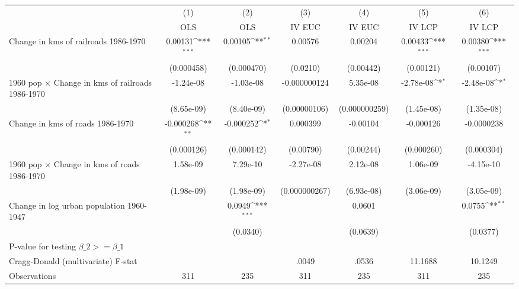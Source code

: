 {
\def\sym#1{\ifmmode^{#1}\else\(^{#1}\)\fi}
\begin{tabular}{l*{6}{c}}
\hline\hline
                &\multicolumn{1}{c}{(1)}&\multicolumn{1}{c}{(2)}&\multicolumn{1}{c}{(3)}&\multicolumn{1}{c}{(4)}&\multicolumn{1}{c}{(5)}&\multicolumn{1}{c}{(6)}\\
                &\multicolumn{1}{c}{OLS}&\multicolumn{1}{c}{OLS}&\multicolumn{1}{c}{IV EUC}&\multicolumn{1}{c}{IV EUC}&\multicolumn{1}{c}{IV LCP}&\multicolumn{1}{c}{IV LCP}\\
\hline
Change in kms of railroads 1986-1970&  0.00131\sym{***}&  0.00105\sym{**} &  0.00576         &  0.00204         &  0.00433\sym{***}&  0.00380\sym{***}\\
                &(0.000458)         &(0.000470)         & (0.0210)         &(0.00442)         &(0.00121)         &(0.00107)         \\
[1em]
1960 pop $\times$ Change in kms of railroads 1986-1970&-1.24e-08         &-1.03e-08         &-0.000000124         & 5.35e-08         &-2.78e-08\sym{*}  &-2.48e-08\sym{*}  \\
                &(8.65e-09)         &(8.40e-09)         &(0.00000106)         &(0.000000259)         &(1.45e-08)         &(1.35e-08)         \\
[1em]
Change in kms of roads 1986-1970&-0.000268\sym{**} &-0.000252\sym{*}  & 0.000399         & -0.00104         &-0.000126         &-0.0000238         \\
                &(0.000126)         &(0.000142)         &(0.00790)         &(0.00244)         &(0.000260)         &(0.000304)         \\
[1em]
1960 pop $\times$ Change in kms of roads 1986-1970& 1.58e-09         & 7.29e-10         &-2.27e-08         & 2.12e-08         & 1.06e-09         &-4.15e-10         \\
                &(1.98e-09)         &(1.98e-09)         &(0.000000267)         &(6.93e-08)         &(3.06e-09)         &(3.05e-09)         \\
[1em]
Change in log urban population 1960-1947&                  &   0.0949\sym{***}&                  &   0.0601         &                  &   0.0755\sym{**} \\
                &                  & (0.0340)         &                  & (0.0639)         &                  & (0.0377)         \\
\hline
P-value for testing $\beta\_{2} >= \beta\_{1}$&                  &                  &                  &                  &                  &                  \\
Cragg-Donald (multivariate) F-stat&                  &                  &    .0049         &    .0536         &  11.1688         &  10.1249         \\
Observations    &      311         &      235         &      311         &      235         &      311         &      235         \\
\hline\hline
\end{tabular}
}
